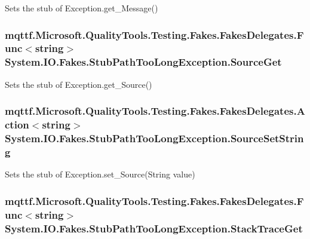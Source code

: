 Sets the stub of Exception.\-get\-\_\-\-Message()

\hypertarget{class_system_1_1_i_o_1_1_fakes_1_1_stub_path_too_long_exception_a4f545b14d63eadaafbfdcf459bc4be01}{
\subsubsection[{Source\-Get}]{\setlength{\rightskip}{0pt plus 5cm}mqttf.\-Microsoft.\-Quality\-Tools.\-Testing.\-Fakes.\-Fakes\-Delegates.\-Func$<$string$>$ System.\-I\-O.\-Fakes.\-Stub\-Path\-Too\-Long\-Exception.\-Source\-Get}}\label{class_system_1_1_i_o_1_1_fakes_1_1_stub_path_too_long_exception_a4f545b14d63eadaafbfdcf459bc4be01}


Sets the stub of Exception.\-get\-\_\-\-Source()

\hypertarget{class_system_1_1_i_o_1_1_fakes_1_1_stub_path_too_long_exception_a3f4e5553c9e7ae2b1bd6d734723fc447}{
\subsubsection[{Source\-Set\-String}]{\setlength{\rightskip}{0pt plus 5cm}mqttf.\-Microsoft.\-Quality\-Tools.\-Testing.\-Fakes.\-Fakes\-Delegates.\-Action$<$string$>$ System.\-I\-O.\-Fakes.\-Stub\-Path\-Too\-Long\-Exception.\-Source\-Set\-String}}\label{class_system_1_1_i_o_1_1_fakes_1_1_stub_path_too_long_exception_a3f4e5553c9e7ae2b1bd6d734723fc447}


Sets the stub of Exception.\-set\-\_\-\-Source(\-String value)

\hypertarget{class_system_1_1_i_o_1_1_fakes_1_1_stub_path_too_long_exception_ae7bf404fe10c1feb5036d0c0e3c18673}{
\subsubsection[{Stack\-Trace\-Get}]{\setlength{\rightskip}{0pt plus 5cm}mqttf.\-Microsoft.\-Quality\-Tools.\-Testing.\-Fakes.\-Fakes\-Delegates.\-Func$<$string$>$ System.\-I\-O.\-Fakes.\-Stub\-Path\-Too\-Long\-Exception.\-Stack\-Trace\-Get}}\label{class_system_1_1_i_o_1_1_fakes_1_1_stub_path_too_long_exception_ae7bf404fe10c1feb5036d0c0e3c18673}


